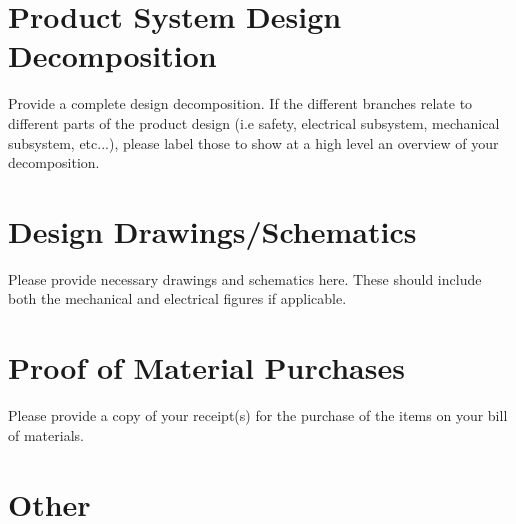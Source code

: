 \documentclass{other/docTemplate}
\begin{document}
\clearpage
\appendix
 \renewcommand{\thesection}{\Alph{section}.}
\setcounter{section}{0}

\section{Product System Design Decomposition}
Provide a complete design decomposition. If the different branches relate to different parts of the product design (i.e safety, electrical subsystem, mechanical subsystem, etc...), please label those to show at a high level an overview of your decomposition. 




\clearpage
\section{Design Drawings/Schematics}
Please provide necessary drawings and schematics here. These should include both the mechanical and electrical figures if applicable. 


\clearpage
\section{Proof of Material Purchases}
Please provide a copy of your receipt(s) for the purchase of the items on your bill of materials. 

\clearpage
\section{Other}
\end{document}
